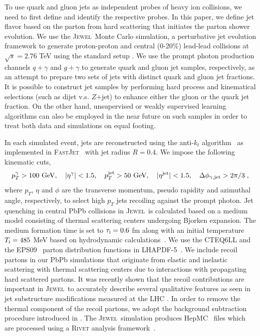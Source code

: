 \documentclass[notoc,preprintnumbers]{JHEP3}
\newcommand{\text}[1]{{\rm #1}}
\newcommand{\jw}{\textsc{Jewel}~}
\begin{document}
To use quark and gluon jets as independent probes of heavy ion collisions, we need to first define and identify the respective probes. In this paper, we define jet flavor based on the parton from hard scattering that initiates the parton shower evolution. We use the \jw Monte Carlo simulation, a perturbative jet evolution framework to generate proton-proton and central (0-20\%) lead-lead collisions at $\sqrt{s}=2.76$ TeV using the standard setup \cite{Zapp:2013zya}. We use the prompt photon production channels \cite{KunnawalkamElayavalli:2016ttl} $q +\gamma$ and $g +\gamma$ to generate quark and gluon jet samples, respectively, as an attempt to prepare two sets of jets with distinct quark and gluon jet fractions. It is possible to construct jet samples by performing hard process and kinematical selections (such as dijet v.s. $Z$+jet) to enhance either the gluon or the quark jet fraction. On the other hand, unsupervised or weakly supervised learning algorithms \cite{Dery:2017fap, Cohen:2017exh, Metodiev:2017vrx,Komiske:2018oaa,Metodiev:2018ftz} can also be employed in the near future on such samples in order to treat both data and simulations on equal footing.

In each simulated event, jets are reconstructed using the anti-$k_t$ algorithm~\cite{Cacciari:2008gp} as implemented in \textsc{FastJet}~\cite{Cacciari:2011ma} with jet radius $R = 0.4$. We impose the following kinematic cuts,
\begin{equation}
    p^{\gamma}_T > 100~{\rm GeV}, ~~~ |\eta^{\rm \gamma}|<1.5, ~~~ p^{\rm jet}_T > 50~{\rm GeV}, ~~~ |\eta^{\rm jet}|<1.5, ~~~\Delta \phi_{\gamma, {\rm jet}} > 2\pi/3\;,
\end{equation}
where $p_T$, $\eta$ and $\phi$ are the transverse momentum, pseudo rapidity and azimuthal angle, respectively, to select high $p_T$ jets recoiling against the prompt photon. Jet quenching in central PbPb collisions in \jw is calculated based on a medium model consisting of thermal scattering centers undergoing Bjorken expansion. The medium formation time is set to $\tau_\text{i}=0.6 $ fm along with an initial temperature $T_\text{i}=485$ MeV based on hydrodynamic calculations~\cite{Shen:2012vn,Shen:2014vra}. We use the \textsc{CTEQ6LL} \cite{Pumplin:2002vw} and the \textsc{EPS09}~\cite{Eskola:2009uj} parton distribution functions in \textsc{LHAPDF-5}~\cite{Whalley:2005nh}. We include recoil partons in our PbPb simulations that originate from elastic and inelastic scattering with thermal scattering centers due to interactions with propagating hard scattered partons. It was recently shown that the recoil contributions are important in \jw to accurately describe several qualitative features as seen in jet substructure modifications measured at the LHC \cite{KunnawalkamElayavalli:2017hxo,Milhano:2017nzm}. In order to remove the thermal component of the recoil partons, we adopt the background subtraction procedure introduced in \cite{KunnawalkamElayavalli:2017hxo,Milhano:2017nzm}. The \jw simulation produces HepMC~\cite{Dobbs:2001ck} files which are processed using a \textsc{Rivet} analysis framework~\cite{Buckley:2010ar}.
\end{document}
